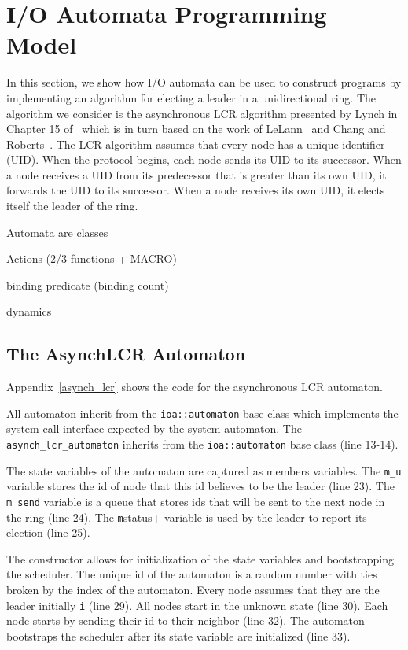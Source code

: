 \section{I/O Automata Programming Model\label{representation}}

In this section, we show how I/O automata can be used to construct programs by implementing an algorithm for electing a leader in a unidirectional ring.
The algorithm we consider is the asynchronous LCR algorithm presented by Lynch in Chapter 15 of~\cite{lynch1996distributed} which is in turn based on the work of LeLann~\cite{le1977distributed} and Chang and Roberts~\cite{chang1979improved}.
The LCR algorithm assumes that every node has a unique identifier (UID).
When the protocol begins, each node sends its UID to its successor.
When a node receives a UID from its predecessor that is greater than its own UID, it forwards the UID to its successor.
When a node receives its own UID, it elects itself the leader of the ring.


Automata are classes

Actions (2/3 functions + MACRO)

binding predicate (binding count)

dynamics


\subsection{The AsynchLCR Automaton}

Appendix~\ref{asynch_lcr} shows the code for the asynchronous LCR automaton.

All automaton inherit from the \verb+ioa::automaton+ base class which implements the system call interface expected by the system automaton.
The \verb+asynch_lcr_automaton+ inherits from the \verb+ioa::automaton+ base class (line 13-14).

The state variables of the automaton are captured as members variables.
The \verb+m_u+ variable stores the id of node that this id believes to be the leader (line 23).
The \verb+m_send+ variable is a queue that stores ids that will be sent to the next node in the ring (line 24).
The \verb+m+status+ variable is used by the leader to report its election (line 25).

The constructor allows for initialization of the state variables and bootstrapping the scheduler.
The unique id of the automaton is a random number with ties broken by the index of the automaton.
Every node assumes that they are the leader initially \verb+i+ (line 29).
All nodes start in the unknown state (line 30).
Each node starts by sending their id to their neighbor (line 32).
The automaton bootstraps the scheduler after its state variable are initialized (line 33).

